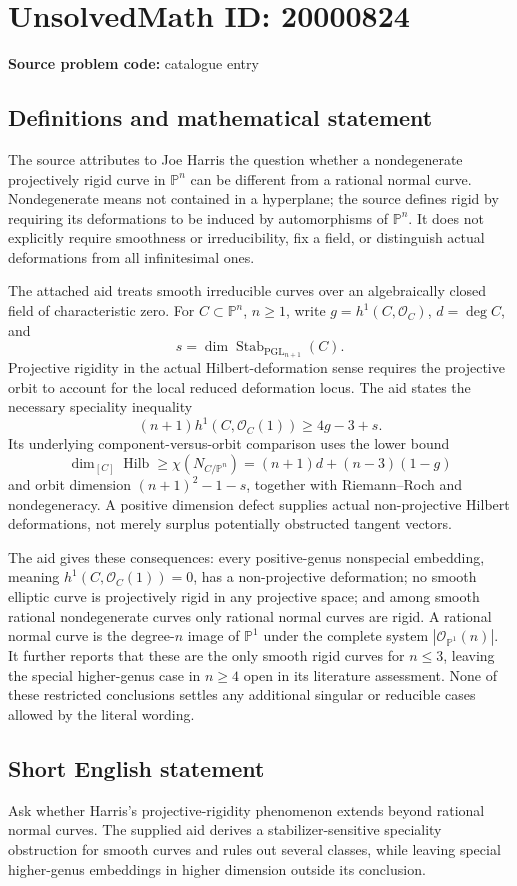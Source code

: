 \documentclass[11pt]{article}
\newcommand{\PP}{\mathbb{P}}
\begin{document}
\section*{UnsolvedMath ID: 20000824}
\textbf{Source problem code:} catalogue entry
\subsection{Definitions and mathematical statement}
The source attributes to Joe Harris the question whether a nondegenerate projectively rigid curve in $\PP^n$ can be different from a rational normal curve. Nondegenerate means not contained in a hyperplane; the source defines rigid by requiring its deformations to be induced by automorphisms of $\PP^n$. It does not explicitly require smoothness or irreducibility, fix a field, or distinguish actual deformations from all infinitesimal ones.

The attached aid treats smooth irreducible curves over an algebraically closed field of characteristic zero. For $C\subset\PP^n$, $n\ge1$, write $g=h^1(C,\mathcal O_C)$, $d=\deg C$, and
\[
s=\dim\operatorname{Stab}_{\operatorname{PGL}_{n+1}}(C).
\]
Projective rigidity in the actual Hilbert-deformation sense requires the projective orbit to account for the local reduced deformation locus. The aid states the necessary speciality inequality
\[
(n+1)h^1(C,\mathcal O_C(1))\ge4g-3+s.
\]
Its underlying component-versus-orbit comparison uses the lower bound
\[
\dim_{[C]}\operatorname{Hilb}\ge\chi(N_{C/\PP^n})=(n+1)d+(n-3)(1-g)
\]
and orbit dimension $(n+1)^2-1-s$, together with Riemann--Roch and nondegeneracy. A positive dimension defect supplies actual non-projective Hilbert deformations, not merely surplus potentially obstructed tangent vectors.

The aid gives these consequences: every positive-genus nonspecial embedding, meaning $h^1(C,\mathcal O_C(1))=0$, has a non-projective deformation; no smooth elliptic curve is projectively rigid in any projective space; and among smooth rational nondegenerate curves only rational normal curves are rigid. A rational normal curve is the degree-$n$ image of $\PP^1$ under the complete system $|\mathcal O_{\PP^1}(n)|$. It further reports that these are the only smooth rigid curves for $n\le3$, leaving the special higher-genus case in $n\ge4$ open in its literature assessment. None of these restricted conclusions settles any additional singular or reducible cases allowed by the literal wording.
\subsection{Short English statement}
Ask whether Harris's projective-rigidity phenomenon extends beyond rational normal curves. The supplied aid derives a stabilizer-sensitive speciality obstruction for smooth curves and rules out several classes, while leaving special higher-genus embeddings in higher dimension outside its conclusion.
\end{document}

